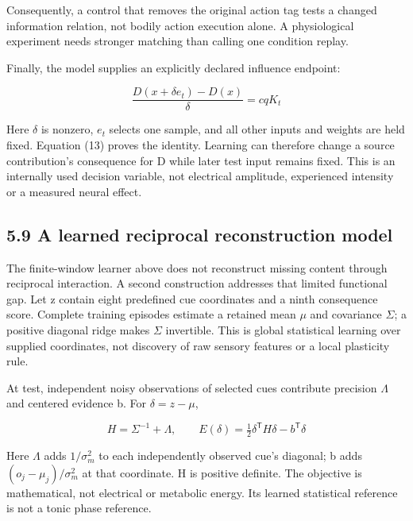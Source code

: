 \documentclass[
  american,
  11pt,
  letterpaper,
]{article}
\begin{document}
Consequently, a control that removes the original action tag tests a changed information relation, not bodily action execution alone. A physiological experiment needs stronger matching than calling one condition replay.

Finally, the model supplies an explicitly declared influence endpoint:

\begin{equation}
\frac{D(x+\delta e_t)-D(x)}{\delta}=cqK_t\tag{14}
\end{equation}

Here \(\delta\) is nonzero, \(e_t\) selects one sample, and all other inputs and weights are held fixed. Equation (13) proves the identity. Learning can therefore change a source contribution's consequence for D while later test input remains fixed. This is an internally used decision variable, not electrical amplitude, experienced intensity or a measured neural effect.

\subsection{5.9 A learned reciprocal reconstruction model}\label{a-learned-reciprocal-reconstruction-model}

The finite-window learner above does not reconstruct missing content through reciprocal interaction. A second construction addresses that limited functional gap. Let z contain eight predefined cue coordinates and a ninth consequence score. Complete training episodes estimate a retained mean \(\mu\) and covariance \(\Sigma\); a positive diagonal ridge makes \(\Sigma\) invertible. This is global statistical learning over supplied coordinates, not discovery of raw sensory features or a local plasticity rule.

At test, independent noisy observations of selected cues contribute precision \(\Lambda\) and centered evidence b. For \(\delta=z-\mu\),

\begin{equation}
H=\Sigma^{-1}+\Lambda,\qquad E(\delta)=\tfrac12\delta^{\mathsf T}H\delta-b^{\mathsf T}\delta\tag{15}
\end{equation}

Here \(\Lambda\) adds \(1/\sigma_m^2\) to each independently observed cue's diagonal; b adds \((o_j-\mu_j)/\sigma_m^2\) at that coordinate. H is positive definite. The objective is mathematical, not electrical or metabolic energy. Its learned statistical reference is not a tonic phase reference.
\end{document}
